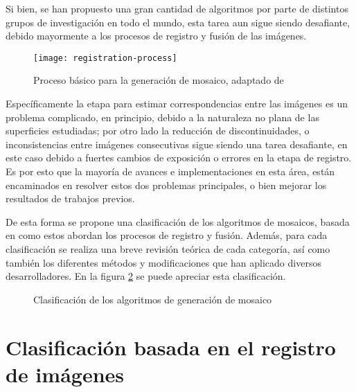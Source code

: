 Si bien, se han propuesto una gran cantidad de algoritmos por parte de distintos grupos de investigación en todo el mundo, esta tarea aun sigue siendo desafiante, debido mayormente a los procesos de registro y fusión de las imágenes.

\begin{figure}[H]
	\centerline{
		\texttt{[image: registration-process]}}
	\caption[Proceso básico para la generación de mosaico]{Proceso básico para la generación de mosaico, adaptado de \cite{capel}}
	\label{imagen:mosaic-process}
\end{figure}

Específicamente la etapa para estimar correspondencias entre las imágenes es un problema complicado, en principio, debido a la naturaleza no plana de las superficies estudiadas; por otro lado la reducción de discontinuidades, o inconsistencias entre imágenes consecutivas sigue siendo una tarea desafiante, en este caso debido a fuertes cambios de exposición o errores en la etapa de registro. Es por esto que la mayoría de avances e implementaciones en esta área, están encaminados en resolver estos dos problemas principales, o bien mejorar los resultados de trabajos previos.

De esta forma se propone una clasificación de los algoritmos de mosaicos, basada en como estos abordan los procesos de registro y fusión. Además, para cada clasificación se realiza una breve revisión teórica de cada categoría, así como también los diferentes métodos y modificaciones que han aplicado diversos desarrolladores. En la figura \ref{imagen:clasificacion} se puede apreciar esta clasificación.


\begin{figure}
	\centering     %
	\hspace{5mm}%
	\caption{Clasificación de los algoritmos de generación de mosaico}
	\label{imagen:clasificacion}
\end{figure}


\section*{Clasificación basada en el registro de imágenes}

